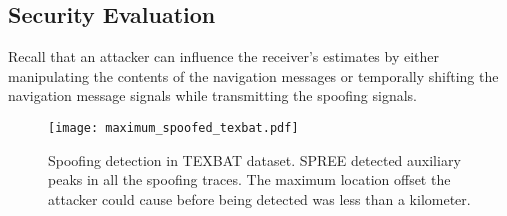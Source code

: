 \documentclass[letterpaper,twocolumn,10pt]{article}
\newcommand{\rxname}{SPREE\xspace}
\begin{document}
\subsection{Security Evaluation}
Recall that an attacker can influence the receiver's estimates by either manipulating the contents of the navigation messages or temporally shifting the navigation message signals while transmitting the spoofing signals.\\
\begin{figure}[t]
\centering
  \texttt{[image: maximum\_spoofed\_texbat.pdf]}
  \caption{Spoofing detection in TEXBAT dataset. \rxname detected auxiliary peaks in all the spoofing traces. The maximum location offset the attacker could cause before being detected was less than a kilometer.}
  \label{fig:texbat_auxpeaks}
\end{figure}
\end{document}
